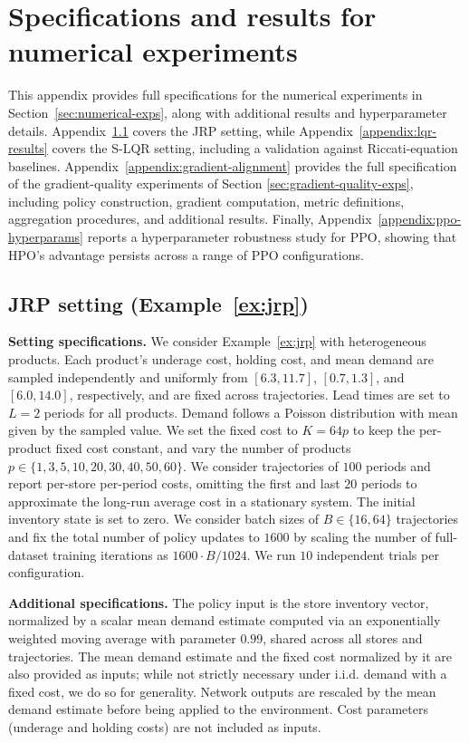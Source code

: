 \documentclass{article}
\theoremstyle{definition}
\theoremstyle{remark}
\begin{document}
\section{Specifications and results for numerical experiments}
\label{appendix:results}

This appendix provides full specifications for the numerical experiments in
Section~\ref{sec:numerical-exps}, along with additional results and hyperparameter details.
Appendix~\ref{appendix:jrp} covers the JRP setting, while Appendix~\ref{appendix:lqr-results}
covers the S-LQR setting, including a validation against Riccati-equation baselines.
Appendix~\ref{appendix:gradient-alignment} provides the full specification of the
gradient-quality experiments of Section \ref{sec:gradient-quality-exps}, including policy construction, gradient computation, metric
definitions, aggregation procedures, and additional results.
Finally, Appendix~\ref{appendix:ppo-hyperparams} reports a hyperparameter robustness 
study for PPO, showing that HPO's advantage persists across a range of PPO configurations.

\subsection{JRP setting (Example~\ref{ex:jrp})}
\label{appendix:jrp}

\textbf{Setting specifications.} We consider Example~\ref{ex:jrp} with heterogeneous 
products. Each product's underage cost, holding cost, and mean demand are sampled 
independently and uniformly from $[6.3, 11.7]$, $[0.7, 1.3]$, and $[6.0, 14.0]$, 
respectively, and are fixed across trajectories. Lead times are set to $L = 2$ periods 
for all products. Demand follows a Poisson distribution with mean given by the sampled 
value. We set the fixed cost to $K = 64p$ to keep the per-product fixed cost constant, 
and vary the number of products $p \in \{1, 3, 5, 10, 20, 30, 40, 50, 60\}$. We consider 
trajectories of $100$ periods and report per-store per-period costs, omitting the first 
and last $20$ periods to approximate the long-run average cost in a stationary system. 
The initial inventory state is set to zero. We consider batch sizes of $B \in \{16, 64\}$ 
trajectories and fix the total number of policy updates to $1600$ by scaling the number 
of full-dataset training iterations as $1600 \cdot B / 1024$. We run $10$ independent 
trials per configuration.

\textbf{Additional specifications.} The policy input is the store inventory vector, 
normalized by a scalar mean demand estimate computed via an exponentially weighted 
moving average with parameter $0.99$, shared across all stores and trajectories. The mean demand estimate and the fixed cost normalized by it are also provided as inputs; while not strictly necessary under i.i.d. demand with a fixed cost, we do so for generality. Network 
outputs are rescaled by the mean demand estimate before being applied to the 
environment. Cost parameters (underage and holding costs) are not included as inputs.
\end{document}
